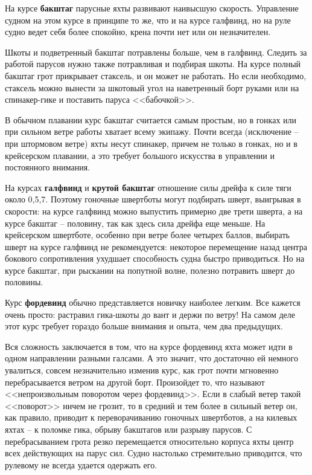 \documentclass[a4paper, 12pt, twoside, final]{scrbook}
\begin{document}
На курсе \textbf{бакштаг} парусные яхты развивают наивысшую скорость. Управление судном на этом курсе в принципе то же, что и на курсе галфвинд, но на руле судно ведет себя более спокойно, крена почти нет или он незначителен.

Шкоты и подветренный бакштаг потравлены больше, чем в галфвинд. Следить за работой парусов нужно также потравливая и подбирая шкоты. На курсе полный бакштаг грот прикрывает стаксель, и он может не работать. Но если необходимо, стаксель можно вынести за шкотовый угол на наветренный борт руками или на спинакер-гике и поставить паруса <<бабочкой>>.

В обычном плавании курс бакштаг считается самым простым, но в гонках или при сильном ветре работы хватает всему экипажу. Почти всегда (исключение \--- при штормовом ветре) яхты несут спинакер, причем не только в гонках, но и в крейсерском плавании, а это требует большого искусства в управлении и постоянного внимания.

На курсах \textbf{галфвинд} и \textbf{крутой бакштаг} отношение силы дрейфа к силе тяги около 0,5,7. Поэтому гоночные швертботы могут подбирать шверт, выигрывая в скорости: на курсе галфвинд можно выпустить примерно две трети шверта, а на курсе бакштаг \--- половину, так как здесь сила дрейфа еще меньше. На крейсерском швертботе, особенно при ветре более четырех баллов, выбирать шверт на курсе галфвинд не рекомендуется: некоторое перемещение назад центра бокового сопротивления ухудшает способность судна быстро приводиться. Но на курсе бакштаг, при рыскании на попутной волне, полезно потравить шверт до половины.

Курс \textbf{фордевинд} обычно представляется новичку наиболее легким. Все кажется очень просто: растравил гика-шкоты до вант и держи по ветру! На самом деле этот курс требует гораздо больше внимания и опыта, чем два предыдущих.

Вся сложность заключается в том, что на курсе фордевинд яхта может идти в одном направлении разными галсами. А это значит, что достаточно ей немного увалиться, совсем незначительно изменив курс, как грот почти мгновенно перебрасывается ветром на другой борт. Произойдет то, что называют <<непроизвольным поворотом через фордевинд>>. Если в слабый ветер такой <<поворот>> ничем не грозит, то в средний и тем более в сильный ветер он, как правило, приводит к переворачиванию гоночных швертботов, а на килевых яхтах \--- к поломке гика, обрыву бакштагов или разрыву парусов. С перебрасыванием грота резко перемещается относительно корпуса яхты центр всех действующих на парус сил. Судно настолько стремительно приводится, что рулевому не всегда удается одержать его.
\end{document}
